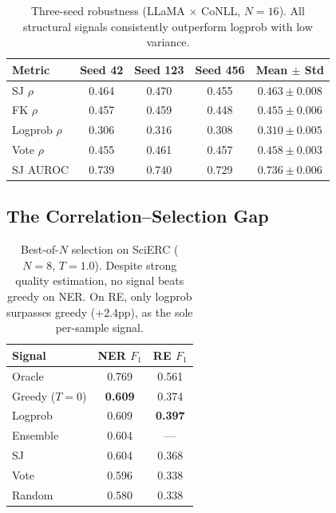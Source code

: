 \documentclass[11pt]{article}
\begin{document}
\begin{table}[t]
\centering
\caption{Three-seed robustness (LLaMA $\times$ CoNLL, $N{=}16$). All structural signals consistently outperform logprob with low variance.}
\label{tab:robustness}
\small
\begin{tabular}{l cccc}
\toprule
Metric & Seed 42 & Seed 123 & Seed 456 & Mean $\pm$ Std \\
\midrule
SJ $\rho$       & 0.464 & 0.470 & 0.455 & $0.463 \pm 0.008$ \\
FK $\rho$       & 0.457 & 0.459 & 0.448 & $0.455 \pm 0.006$ \\
Logprob $\rho$  & 0.306 & 0.316 & 0.308 & $0.310 \pm 0.005$ \\
Vote $\rho$     & 0.455 & 0.461 & 0.457 & $0.458 \pm 0.003$ \\
SJ AUROC        & 0.739 & 0.740 & 0.729 & $0.736 \pm 0.006$ \\
\bottomrule
\end{tabular}
\end{table}

\subsection{The Correlation--Selection Gap}
\label{sec:results-gap}

\begin{table}[t]
\centering
\caption{Best-of-$N$ selection on SciERC ($N{=}8$, $T{=}1.0$). Despite strong quality estimation, no signal beats greedy on NER. On RE, only logprob surpasses greedy (+2.4pp), as the sole per-sample signal.}
\label{tab:selection}
\small
\begin{tabular}{l cc}
\toprule
Signal & NER $F_1$ & RE $F_1$ \\
\midrule
Oracle         & 0.769 & 0.561 \\
\midrule
Greedy ($T{=}0$) & \textbf{0.609} & 0.374 \\
Logprob        & 0.609          & \textbf{0.397} \\
Ensemble       & 0.604          & --- \\
SJ             & 0.604          & 0.368 \\
Vote           & 0.596          & 0.338 \\
Random         & 0.580          & 0.338 \\
\bottomrule
\end{tabular}
\end{table}
\end{document}
